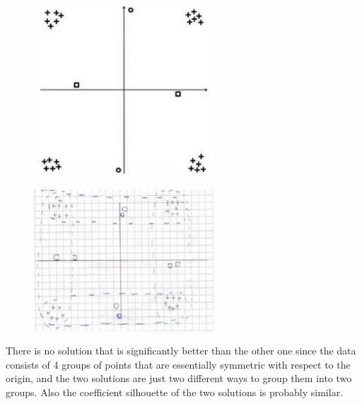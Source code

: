 \documentclass[a4paper,11pt,oneside]{book}
\begin{document}
\begin{enumerate}
    \begin{figure}[H]
        \centering
        \includegraphics[width=0.6\textwidth,height=0.6\textheight,keepaspectratio]{images/graph_7_Sept_2021.png}
    \end{figure}

    \begin{solution}
        \begin{figure}[H]
            \centering
            \includegraphics[width=0.6\textwidth,height=0.6\textheight,keepaspectratio]{images/solution_4_7_Sept_2021.png}
        \end{figure}

        There is no solution that is significantly better than the other one since the data consists of 4 groups of points that are essentially symmetric with respect to the origin, and the two solutions are just two different ways to group them into two groups. Also the coefficient silhouette of the two solutions is probably similar.
    \end{solution}
\end{enumerate}

\end{document}
